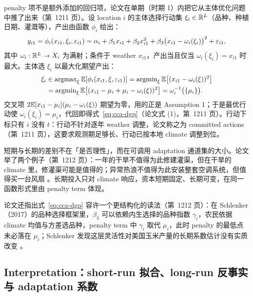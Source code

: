 \begin{intuition}
penalty 项不是额外添加的回归项，论文在单期（时期 1）内把它从主体优化问题中推了出来（第~1211 页）。设 location $i$ 的主体选择行动集 $\xi_i\in\mathbb{R}^L$（品种、种植日期、灌溉等），产出由函数 $\phi_i$ 给出：
\begin{equation*}
y_{i1}=\phi_i(x_{i1},\xi_i,\varepsilon_{i1})
=\alpha_i+\beta_1 x_{i1}+\beta_2 x_{i1}^2+\beta_3\bigl(x_{i1}-\omega_i(\xi_i)\bigr)^2+\varepsilon_{i1},
\end{equation*}
其中 $\omega_i:\mathbb{R}^L\to X_i$ 为满射；条件于 weather $x_{i1}$，产出当且仅当 $\omega_i(\xi_i)=x_{i1}$ 时最大。主体选 $\xi_i$ 以最大化期望产出：
\begin{align*}
\xi_i&\in\operatorname{argmax}_{\xi}\mathbb{E}[\phi_i(x_{i1},\xi,\varepsilon_{i1})]
=\operatorname{argmin}_{\xi}\mathbb{E}\bigl[(x_{i1}-\omega_i(\xi))^2\bigr]\\
&=\operatorname{argmin}_{\xi}\mathbb{E}\bigl[(x_{i1}-\mu_i+\mu_i-\omega_i(\xi))^2\bigr]
=\omega_i^{-1}\bigl(\{\mu_i\}\bigr).
\end{align*}
交叉项 $2\mathbb{E}[x_{i1}-\mu_i](\mu_i-\omega_i(\xi))$ 期望为零，用的正是 Assumption 1；于是最优行动使 $\omega_i(\xi_i)=\mu_i$，代回即得式~\ref{eq:cca-dgp}（论文式 (1)，第~1211 页）。行动下标只有 $i$ 没有 $t$：行动不针对逐年 weather 调整，论文称之为 committed actions（第~1211 页），这要求观测期足够长、行动已按本地 climate 调整到位。

短期与长期的差别不在「是否理性」，而在可调用 adaptation 通道集的大小。论文举了两个例子（第~1212 页）：一年的干旱不值得为此修建灌渠，但在干旱的 climate 里，修灌渠可能是值得的；异常热浪不值得为此安装整套空调系统，但值得买一台风扇 \citep{auffhammer2014empirical}。长期投入只对 climate 响应，资本短期固定、长期可变，在同一函数形式里由 penalty term 体现。

论文还指出式~\ref{eq:cca-dgp} 容许一个更结构化的读法（第~1212 页）：在 Schlenker（2017）的品种选择框架里，$\beta_3$ 可以依赖内生选择的品种指数 $\gamma_i$，农民依据 climate 均值与方差选品种，penalty term 中 $\gamma_i$ 取代 $\mu_i$，此时 penalty 的最低点未必落在 $\mu_i$；Schlenker 发现这层灵活性对美国玉米产量的长期系数估计没有实质改变 \citep{schlenker2017interannual}。
\end{intuition}

\subsection{Interpretation：short-run 拟合、long-run 反事实与 adaptation 系数}

